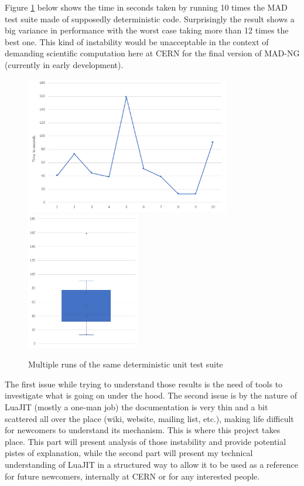 
Figure \ref{fig:pb-statement} below shows the time in seconds taken by running 10
times the MAD test suite made of supposedly deterministic code. Surprisingly the
result shows a big variance in performance with the worst case taking more than
12 times the best one. This kind of instability would be unacceptable in the
context of demanding scientific computation here at CERN for the final version
of MAD-NG (currently in early development).

\begin{figure}[H]
    \centering
	\includegraphics[height=6cm]{./Images/pb-statement-curve.pdf}
	\includegraphics[height=6cm]{./Images/pb-statement-box.pdf}
    \caption{Multiple runs of the same deterministic unit test suite}
    \label{fig:pb-statement}
\end{figure}

The first issue while trying to understand those results is the need of tools
to investigate what is going on under the hood. The second issue is by the
nature of LuaJIT (mostly a one-man job) the documentation is very thin and a bit
scattered all over the place (wiki, website, mailing list, etc.), making life
difficult for newcomers to understand its mechanism.
This is where this project takes place. This part will present analysis of those
instability and provide potential pistes of explanation, while the second part
will present my technical understanding of LuaJIT in a structured way to allow
it to be used as a reference for future newcomers, internally at CERN or for any
interested people.
